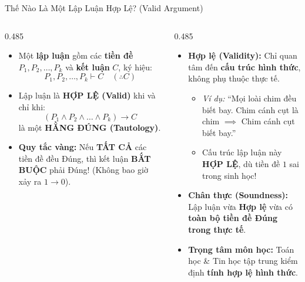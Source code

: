 \documentclass[aspectratio=169, 10pt]{beamer}
\begin{document}
\begin{frame}{Thế Nào Là Một Lập Luận Hợp Lệ? (Valid Argument)}
  \begin{columns}[t, onlytextwidth]
    \begin{column}{0.485\textwidth}
      \begin{cozyDef}
        \small
        \begin{itemize}
          \setlength{\itemsep}{1.5pt}
          \item Một \textbf{lập luận} gồm các \textbf{tiền đề} $P_1, P_2, \dots, P_k$ và \textbf{kết luận} $C$, ký hiệu:
          $$P_1, P_2, \dots, P_k \vdash C \quad (\therefore C)$$
          \item Lập luận là \textbf{\textcolor{cozyTrue}{HỢP LỆ (Valid)}} khi và chỉ khi:
          $$(P_1 \land P_2 \land \dots \land P_k) \to C$$
          là một \textbf{HẰNG ĐÚNG (Tautology)}.
          \item \textbf{Quy tắc vàng:} Nếu \textbf{TẤT CẢ} các tiền đề đều Đúng, thì kết luận \textbf{BẮT BUỘC} phải Đúng! (Không bao giờ xảy ra $1 \to 0$).
        \end{itemize}
      \end{cozyDef}
    \end{column}
    \begin{column}{0.485\textwidth}
      \begin{cozyInsight}
        \small
        \begin{itemize}
          \setlength{\itemsep}{1.5pt}
          \item \textbf{Hợp lệ (Validity):} Chỉ quan tâm đến \textbf{cấu trúc hình thức}, không phụ thuộc thực tế.
          \begin{itemize}
            \setlength{\itemsep}{0.8pt}
            \item \textit{Ví dụ:} ``Mọi loài chim đều biết bay. Chim cánh cụt là chim $\implies$ Chim cánh cụt biết bay.''
            \item Cấu trúc lập luận này \textbf{\textcolor{cozyTrue}{HỢP LỆ}}, dù tiền đề $1$ sai trong sinh học!
          \end{itemize}
          \item \textbf{Chân thực (Soundness):} Lập luận vừa \textbf{Hợp lệ} vừa có \textbf{toàn bộ tiền đề Đúng trong thực tế}.
          \item \textbf{Trọng tâm môn học:} Toán học \& Tin học tập trung kiểm định \textbf{tính hợp lệ hình thức}.
        \end{itemize}
      \end{cozyInsight}
    \end{column}
  \end{columns}
\end{frame}
\end{document}
